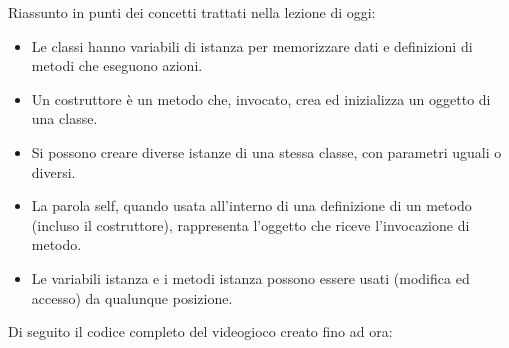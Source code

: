 \documentclass[12pt,a4paper]{article}
\begin{document}
Riassunto in punti dei concetti trattati nella lezione di oggi:
\begin{itemize}
     \item Le classi hanno variabili di istanza per memorizzare dati e definizioni di metodi che eseguono azioni.
     \item Un costruttore è un metodo che, invocato, crea ed inizializza un oggetto di una classe.
     \item Si possono creare diverse istanze di una stessa classe, con parametri uguali o diversi.
     \item La parola self, quando usata all'interno di una definizione di un metodo (incluso il costruttore), rappresenta l'oggetto che riceve l'invocazione di metodo.
     \item Le variabili istanza e i metodi istanza possono essere usati (modifica ed accesso) da qualunque posizione.
   \end{itemize}
Di seguito il codice completo del videogioco creato fino ad ora:
\end{document}

